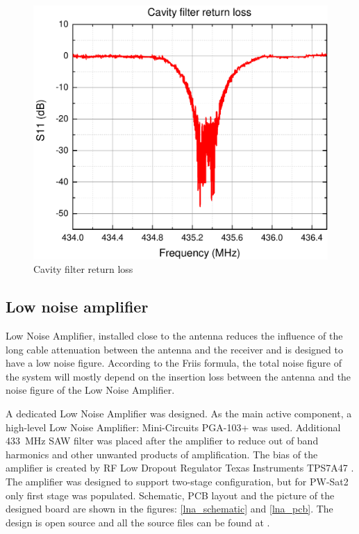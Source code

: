 \begin{figure}
    \centering
    \includegraphics[width=0.5\paperwidth]{img/7/FilterMatchG.pdf}
    \caption{Cavity filter return loss}
    \label{cavity_filter_return_loss}
\end{figure}



\subsection{Low noise amplifier}
Low Noise Amplifier, installed close to the antenna reduces the influence of the long cable attenuation between the antenna and the receiver and is designed to have a low noise figure. According to the Friis formula, the total noise figure of the system will mostly depend on the insertion loss between the antenna and the noise figure of the Low Noise Amplifier. 

A dedicated Low Noise Amplifier was designed. As the main active component, a high-level Low Noise Amplifier: Mini-Circuits PGA-103+ \cite{lna_pga_datasheet} was used. Additional \SI{433}{\MHz} SAW filter was placed after the amplifier to reduce out of band harmonics and other unwanted products of amplification. The bias of the amplifier is created by RF Low Dropout Regulator Texas Instruments TPS7A47 \cite{lna_ldo_datasheet}. The amplifier was designed to support two-stage configuration, but for PW-Sat2 only first stage was populated. Schematic, PCB layout and the picture of the designed board are shown in the figures: \ref{lna_schematic} and \ref{lna_pcb}. The design is open source and all the source files can be found at \cite{lna_github}.

